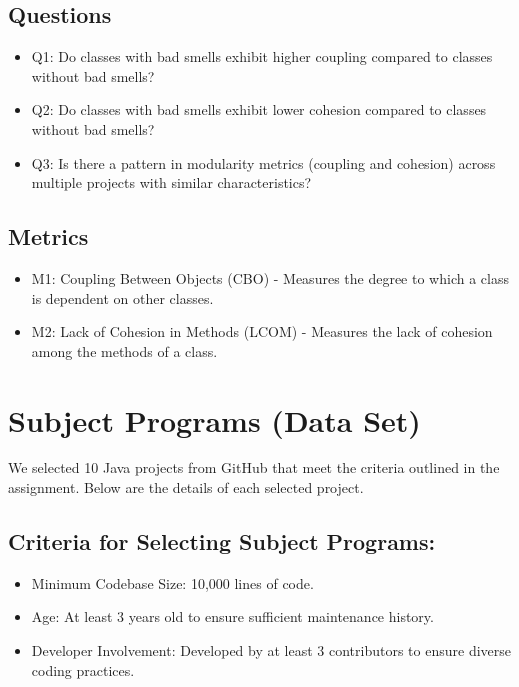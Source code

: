 \documentclass[conference]{IEEEtran}
\begin{document}
    \subsection{Questions}
        \begin{itemize}
            \item Q1: Do classes with bad smells exhibit higher coupling compared to classes without bad smells?
            \item Q2: Do classes with bad smells exhibit lower cohesion compared to classes without bad smells?
            \item Q3: Is there a pattern in modularity metrics (coupling and cohesion) across multiple projects with similar characteristics?
        \end{itemize}
    \subsection{Metrics}
        \begin{itemize}
            \item M1: Coupling Between Objects (CBO) - Measures the degree to which a class is dependent on other classes.
            \item M2: Lack of Cohesion in Methods (LCOM) - Measures the lack of cohesion among the methods of a class.
        \end{itemize}
	
    \section{Subject Programs (Data Set)}
	We selected 10 Java projects from GitHub that meet the criteria outlined in the assignment. Below are the details of each selected project.
        \subsection{Criteria for Selecting Subject Programs:}
	   \begin{itemize}
		\item Minimum Codebase Size: 10,000 lines of code.
		\item Age: At least 3 years old to ensure sufficient maintenance history.
		\item Developer Involvement: Developed by at least 3 contributors to ensure diverse coding practices.
	   \end{itemize}
	
\end{document}
